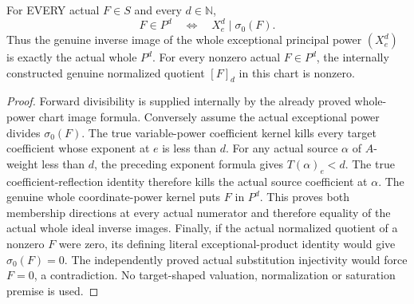 \begin{theorem}
\label{hir:actual-formal-monomial-blowup-whole-power-reflection}
For EVERY actual $F\in S$ and every $d\in\mathbb N$,
\[
 F\in P^d\quad\Longleftrightarrow\quad X_e^d\mid\sigma_0(F).
\]
Thus the genuine inverse image of the whole exceptional principal power
$(X_e^d)$ is exactly the actual whole $P^d$.
For every nonzero actual $F\in P^d$, the internally constructed genuine
normalized quotient $[F]_d$ in this chart is nonzero.
\leanok
\end{theorem}
\begin{proof}
Forward divisibility is supplied internally by the already proved
whole-power chart image formula. Conversely assume the actual exceptional
power divides $\sigma_0(F)$. The true variable-power coefficient kernel
kills every target coefficient whose exponent at $e$ is less than $d$.
For any actual source $\alpha$ of $A$-weight less than $d$, the preceding
exponent formula gives $T(\alpha)_e<d$. The true coefficient-reflection
identity therefore kills the actual source coefficient at $\alpha$.
The genuine whole coordinate-power kernel puts $F$ in $P^d$.
This proves both membership directions at every actual numerator and
therefore equality of the actual whole ideal inverse images.
Finally, if the actual normalized quotient of a nonzero $F$ were zero,
its defining literal exceptional-product identity would give
$\sigma_0(F)=0$. The independently proved actual substitution injectivity
would force $F=0$, a contradiction. No target-shaped valuation,
normalization or saturation premise is used.
\end{proof}
